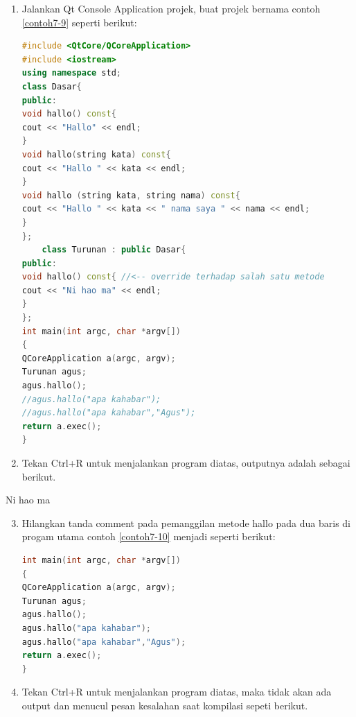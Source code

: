 \begin{enumerate}

\item
  Jalankan Qt Console Application projek, buat projek bernama contoh 
  \ref{contoh7-9}  seperti berikut:

\begin{lstlisting}[language=c++, caption=Penyembunyian metode kelas dasar, label=contoh7-9]
#include <QtCore/QCoreApplication>
#include <iostream>
using namespace std;
class Dasar{
public:
void hallo() const{
cout << "Hallo" << endl;
}
void hallo(string kata) const{
cout << "Hallo " << kata << endl;
}
void hallo (string kata, string nama) const{
cout << "Hallo " << kata << " nama saya " << nama << endl;
}
};
    class Turunan : public Dasar{
public:
void hallo() const{ //<-- override terhadap salah satu metode
cout << "Ni hao ma" << endl;
}
};
int main(int argc, char *argv[])
{
QCoreApplication a(argc, argv);
Turunan agus;
agus.hallo();
//agus.hallo("apa kahabar");
//agus.hallo("apa kahabar","Agus");
return a.exec();
}
\end{lstlisting}
\item
  Tekan Ctrl+R untuk menjalankan program diatas, outputnya adalah
  sebagai berikut.
\end{enumerate}

\begin{lcverbatim}
Ni hao ma
\end{lcverbatim}

\begin{enumerate}

\setcounter{enumi}{2}
\item
  Hilangkan tanda comment pada pemanggilan metode hallo pada dua baris
  di progam utama contoh \ref{contoh7-10} menjadi seperti berikut:

\begin{lstlisting}[language=c++, caption=Menghilangkan comment pada metode hallo, label=contoh7-10]
int main(int argc, char *argv[])
{
QCoreApplication a(argc, argv);
Turunan agus;
agus.hallo();
agus.hallo("apa kahabar");
agus.hallo("apa kahabar","Agus");
return a.exec();
}
\end{lstlisting}
\item
  Tekan Ctrl+R untuk menjalankan program diatas, maka tidak akan ada
  output dan menucul pesan kesalahan saat kompilasi sepeti berikut.
\end{enumerate}

\begin{figure}[htbp]
\centering
{}

\end{figure}

